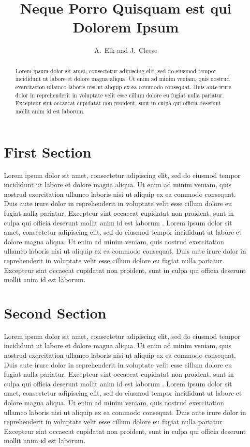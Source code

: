 \documentclass{iaeapaper}
\title{Neque Porro Quisquam est qui Dolorem Ipsum}
\author{A.~Elk and J.~Cleese}
\affil{The University}
\begin{document}
\maketitle

\begin{abstract}
Lorem ipsum dolor sit amet, consectetur adipiscing elit, sed do eiusmod tempor 
incididunt ut labore et dolore magna aliqua. Ut enim ad minim veniam, quis nostrud 
exercitation ullamco laboris nisi ut aliquip ex ea commodo consequat. Duis aute 
irure dolor in reprehenderit in voluptate velit esse cillum dolore eu fugiat nulla 
pariatur. Excepteur sint occaecat cupidatat non proident, sunt in culpa qui officia 
deserunt mollit anim id est laborum.
\end{abstract}

\section{First Section}

Lorem ipsum dolor sit amet, consectetur adipiscing elit, sed do eiusmod tempor 
incididunt ut labore et dolore magna aliqua. Ut enim ad minim veniam, quis nostrud 
exercitation ullamco laboris nisi ut aliquip ex ea commodo consequat. Duis aute 
irure dolor in reprehenderit in voluptate velit esse cillum dolore eu fugiat nulla 
pariatur. Excepteur sint occaecat cupidatat non proident, sunt in culpa qui officia 
deserunt mollit anim id est laborum \cite{howard:2012}.
Lorem ipsum dolor sit amet, consectetur adipiscing elit, sed do eiusmod tempor 
incididunt ut labore et dolore magna aliqua. Ut enim ad minim veniam, quis nostrud 
exercitation ullamco laboris nisi ut aliquip ex ea commodo consequat. Duis aute 
irure dolor in reprehenderit in voluptate velit esse cillum dolore eu fugiat nulla 
pariatur. Excepteur sint occaecat cupidatat non proident, sunt in culpa qui officia 
deserunt mollit anim id est laborum.

\section{Second Section}

Lorem ipsum dolor sit amet, consectetur adipiscing elit, sed do eiusmod tempor 
incididunt ut labore et dolore magna aliqua. Ut enim ad minim veniam, quis nostrud 
exercitation ullamco laboris nisi ut aliquip ex ea commodo consequat. Duis aute 
irure dolor in reprehenderit in voluptate velit esse cillum dolore eu fugiat nulla 
pariatur. Excepteur sint occaecat cupidatat non proident, sunt in culpa qui officia 
deserunt mollit anim id est laborum \cite{casati:2009}.
Lorem ipsum dolor sit amet, consectetur adipiscing elit, sed do eiusmod tempor 
incididunt ut labore et dolore magna aliqua. Ut enim ad minim veniam, quis nostrud 
exercitation ullamco laboris nisi ut aliquip ex ea commodo consequat. Duis aute 
irure dolor in reprehenderit in voluptate velit esse cillum dolore eu fugiat nulla 
pariatur. Excepteur sint occaecat cupidatat non proident, sunt in culpa qui officia 
deserunt mollit anim id est laborum.




\end{document}
